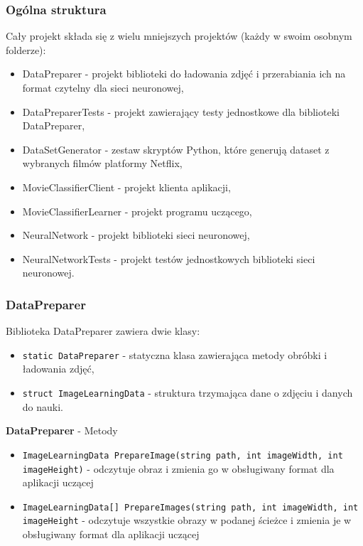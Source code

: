 \documentclass[12pt,a4paper]{article}
\begin{document}
	\subsubsection*{Ogólna struktura}
    Cały projekt składa się z wielu mniejszych projektów (każdy w swoim osobnym folderze):
    \begin{itemize}
        \item DataPreparer - projekt biblioteki do ładowania zdjęć i przerabiania ich na format czytelny dla sieci neuronowej,
        \item DataPreparerTests - projekt zawierający testy jednostkowe dla biblioteki DataPreparer,
        \item DataSetGenerator - zestaw skryptów Python, które generują dataset z wybranych filmów platformy Netflix,
        \item MovieClassifierClient - projekt klienta aplikacji,
        \item MovieClassifierLearner - projekt programu uczącego,
        \item NeuralNetwork - projekt biblioteki sieci neuronowej,
        \item NeuralNetworkTests - projekt testów jednostkowych biblioteki sieci neuronowej.
    \end{itemize}
    
    \subsubsection*{DataPreparer}
    Biblioteka DataPreparer zawiera dwie klasy:
    \begin{itemize}
        \item \lstinline{static DataPreparer} - statyczna klasa zawierająca metody obróbki i ładowania zdjęć,
        \item \lstinline{struct ImageLearningData} - struktura trzymająca dane o zdjęciu i danych do nauki.
    \end{itemize}
    
    \textbf{DataPreparer} - Metody
    \begin{itemize}
        \item \lstinline{ImageLearningData PrepareImage(string path, int imageWidth, int imageHeight)} - odczytuje obraz i zmienia go w obsługiwany format dla aplikacji uczącej
        \item \lstinline{ImageLearningData[] PrepareImages(string path, int imageWidth, int imageHeight} - odczytuje wszystkie obrazy w podanej ścieżce i zmienia je w obsługiwany format dla aplikacji uczącej
    \end{itemize}
    
\end{document}
